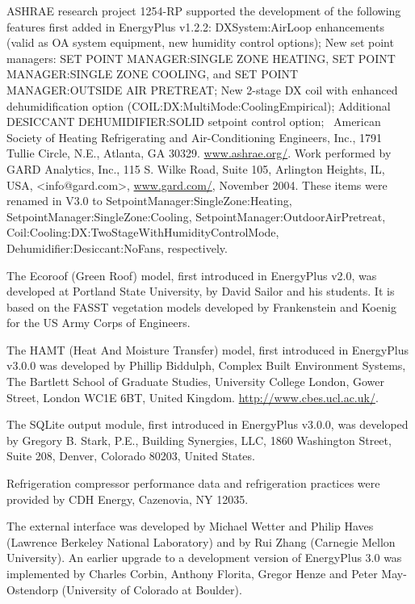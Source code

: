 ASHRAE research project 1254-RP supported the development of the following features first added in EnergyPlus v1.2.2: DXSystem:AirLoop enhancements (valid as OA system equipment, new humidity control options); New set point managers: SET POINT MANAGER:SINGLE ZONE HEATING, SET POINT MANAGER:SINGLE ZONE COOLING, and SET POINT MANAGER:OUTSIDE AIR PRETREAT; New 2-stage DX coil with enhanced dehumidification option (COIL:DX:MultiMode:CoolingEmpirical); Additional DESICCANT DEHUMIDIFIER:SOLID setpoint control option;~ American Society of Heating Refrigerating and Air-Conditioning Engineers, Inc., 1791 Tullie Circle, N.E., Atlanta, GA 30329. \href{http://www.ashrae.org/}{www.ashrae.org/}. Work performed by GARD Analytics, Inc., 115 S. Wilke Road, Suite 105, Arlington Heights, IL, USA, \textless{}info@gard.com\textgreater{}, \href{http://www.gard.com/}{www.gard.com/}, November 2004. These items were renamed in V3.0 to SetpointManager:SingleZone:Heating, SetpointManager:SingleZone:Cooling, SetpointManager:OutdoorAirPretreat, Coil:Cooling:DX:TwoStageWithHumidityControlMode, Dehumidifier:Desiccant:NoFans, respectively.

The Ecoroof (Green Roof) model, first introduced in EnergyPlus v2.0, was developed at Portland State University, by David Sailor and his students. It is based on the FASST vegetation models developed by Frankenstein and Koenig for the US Army Corps of Engineers.

The HAMT (Heat And Moisture Transfer) model, first introduced in EnergyPlus v3.0.0 was developed by Phillip Biddulph, Complex Built Environment Systems, The Bartlett School of Graduate Studies, University College London, Gower Street, London WC1E 6BT, United Kingdom. \url{http://www.cbes.ucl.ac.uk/}.

The SQLite output module, first introduced in EnergyPlus v3.0.0, was developed by Gregory B. Stark, P.E., Building Synergies, LLC, 1860 Washington Street, Suite 208, Denver, Colorado 80203, United States.

Refrigeration compressor performance data and refrigeration practices were provided by CDH Energy, Cazenovia, NY 12035.

The external interface was developed by Michael Wetter and Philip Haves (Lawrence Berkeley National Laboratory) and by Rui Zhang (Carnegie Mellon University). An earlier upgrade to a development version of EnergyPlus 3.0 was implemented by Charles Corbin, Anthony Florita, Gregor Henze and Peter May-Ostendorp (University of Colorado at Boulder).

